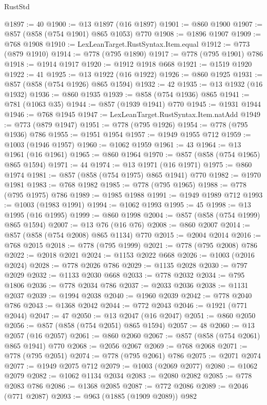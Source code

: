 \begin{lexlean}{RustStd}
\begin{coremodule}
@1897 := 40
@1900 := @13 @1897 (@16 @1897)
@1901 := @860 @1900
@1907 := @857 (@858 (@754 @1901) @865 @1053) @770
@1908 := @1896 @1907
@1909 := @768 @1908
@1910 := LexLeanTarget.RustSyntax.Item.equal
@1912 := @773 (@879 @1910)
@1914 := @778 (@795 @1890)
@1917 := @778 (@795 @1901) @786
@1918 := @1914 @1917
@1920 := @1912 @1918 @668
@1921 := @1519 @1920
@1922 := 41
@1925 := @13 @1922 (@16 @1922)
@1926 := @860 @1925
@1931 := @857 (@858 (@754 @1926) @865 @1594)
@1932 := 42
@1935 := @13 @1932 (@16 @1932)
@1936 := @860 @1935
@1939 := @858 (@754 @1936) @865
@1941 := @781 (@1063 @35)
@1944 := @857 (@1939 @1941) @770
@1945 := @1931 @1944
@1946 := @768 @1945
@1947 := LexLeanTarget.RustSyntax.Item.natAdd
@1949 := @773 (@879 @1947)
@1951 := @778 (@795 @1926)
@1954 := @778 (@795 @1936) @786
@1955 := @1951 @1954
@1957 := @1949 @1955 @712
@1959 := @1003 (@1946 @1957)
@1960 := @1062 @1959
@1961 := 43
@1964 := @13 @1961 (@16 @1961)
@1965 := @860 @1964
@1970 := @857 (@858 (@754 @1965) @865 @1594)
@1971 := 44
@1974 := @13 @1971 (@16 @1971)
@1975 := @860 @1974
@1981 := @857 (@858 (@754 @1975) @865 @1941) @770
@1982 := @1970 @1981
@1983 := @768 @1982
@1985 := @778 (@795 @1965)
@1988 := @778 (@795 @1975) @786
@1989 := @1985 @1988
@1991 := @1949 @1989 @712
@1993 := @1003 (@1983 @1991)
@1994 := @1062 @1993
@1995 := 45
@1998 := @13 @1995 (@16 @1995)
@1999 := @860 @1998
@2004 := @857 (@858 (@754 @1999) @865 @1594)
@2007 := @13 @76 (@16 @76)
@2008 := @860 @2007
@2014 := @857 (@858 (@754 @2008) @865 @1134) @770
@2015 := @2004 @2014
@2016 := @768 @2015
@2018 := @778 (@795 @1999)
@2021 := @778 (@795 @2008) @786
@2022 := @2018 @2021
@2024 := @1153 @2022 @668
@2026 := @1003 (@2016 @2024)
@2028 := @778 @2026 @786
@2029 := @1135 @2028
@2030 := @797 @2029
@2032 := @1133 @2030 @668
@2033 := @778 @2032
@2034 := @795 @1806
@2036 := @778 @2034 @786
@2037 := @2033 @2036
@2038 := @1131 @2037
@2039 := @1994 @2038
@2040 := @1960 @2039
@2042 := @778 @2040 @786
@2043 := @1368 @2042
@2044 := @772 @2043
@2046 := @1921 (@771 @2044)
@2047 := 47
@2050 := @13 @2047 (@16 @2047)
@2051 := @860 @2050
@2056 := @857 (@858 (@754 @2051) @865 @1594)
@2057 := 48
@2060 := @13 @2057 (@16 @2057)
@2061 := @860 @2060
@2067 := @857 (@858 (@754 @2061) @865 @1941) @770
@2068 := @2056 @2067
@2069 := @768 @2068
@2071 := @778 (@795 @2051)
@2074 := @778 (@795 @2061) @786
@2075 := @2071 @2074
@2077 := @1949 @2075 @712
@2079 := @1003 (@2069 @2077)
@2080 := @1062 @2079
@2082 := @1062 @1134 @2034
@2083 := @2080 @2082
@2085 := @778 @2083 @786
@2086 := @1368 @2085
@2087 := @772 @2086
@2089 := @2046 (@771 @2087)
@2093 := @963 (@1885 (@1909 @2089)) @982

\end{coremodule}
\end{lexlean}
